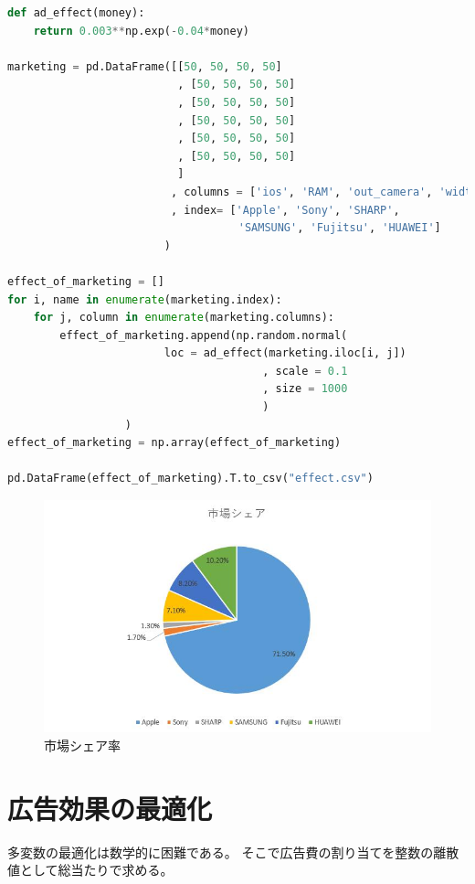 \documentclass{jarticle}
\begin{document}
\begin{lstlisting}[caption=各製品の属性ごとの理解度, frame=single, language=python]
def ad_effect(money):
    return 0.003**np.exp(-0.04*money)
    
marketing = pd.DataFrame([[50, 50, 50, 50]
                          , [50, 50, 50, 50]
                          , [50, 50, 50, 50]
                          , [50, 50, 50, 50]
                          , [50, 50, 50, 50]
                          , [50, 50, 50, 50]
                          ]
                         , columns = ['ios', 'RAM', 'out_camera', 'width']
                         , index= ['Apple', 'Sony', 'SHARP', 
                         　　　　　  'SAMSUNG', 'Fujitsu', 'HUAWEI']
                        )

effect_of_marketing = []
for i, name in enumerate(marketing.index):
    for j, column in enumerate(marketing.columns):
        effect_of_marketing.append(np.random.normal(
        				loc = ad_effect(marketing.iloc[i, j])
                                       , scale = 0.1
                                       , size = 1000
                                       )
                  )
effect_of_marketing = np.array(effect_of_marketing)

pd.DataFrame(effect_of_marketing).T.to_csv("effect.csv")
\end{lstlisting}

\begin{figure}[H]
	\centering
	\includegraphics[width=15cm]{share.jpg}
	\caption{市場シェア率}
\end{figure}	


\section{広告効果の最適化}
多変数の最適化は数学的に困難である。
そこで広告費の割り当てを整数の離散値として総当たりで求める。
\end{document}
